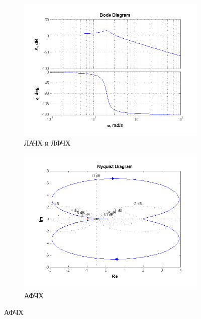 \documentclass[a4paper, 11pt, russian]{article}
\begin{document}
    \begin{figure}[ht!]
        \centering
        \begin{subfigure}[h]{0.48\textwidth}
            \includegraphics[width = \textwidth]{oscillatoryLinkBode}
            \caption{ЛАЧХ и ЛФЧХ}
        \end{subfigure}
        \hfill
        \begin{subfigure}[h]{0.48\textwidth}
            \includegraphics[width = \textwidth]{oscillatoryLinkNyquist}
            \caption{АФЧХ}
        \end{subfigure}
	\end{figure}
\end{document}
